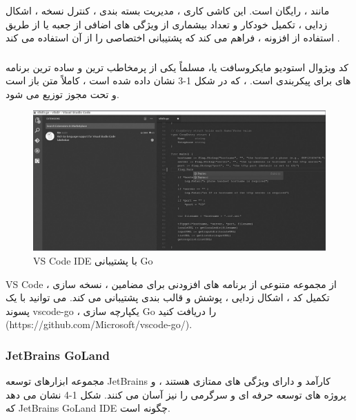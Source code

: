 \documentclass[12pt]{book}
\begin{document}
مانند  ،  رایگان است.
این کاشی کاری ، مدیریت بسته بندی ، کنترل نسخه ، اشکال زدایی ، تکمیل خودکار و تعداد بیشماری از ویژگی های اضافی از جعبه یا از طریق استفاده از افزونه  ، فراهم می کند که پشتیبانی اختصاصی را از آن استفاده می کند .
\subsubsection{}
کد ویژوال استودیو مایکروسافت یا، مسلماً یکی از پرمخاطب ترین و ساده ترین برنامه های  برای پیکربندی است.
 ، که در شکل 1-3 نشان داده شده است ، کاملاً متن باز است و تحت مجوز  توزیع می شود.
\begin{figure}
	\caption{VS Code IDE با پشتیبانی Go}
	\centering
	\includegraphics[width=1\textwidth]{images/vscode.png}
\end{figure}

VS Code از مجموعه متنوعی از برنامه های افزودنی برای مضامین ، نسخه سازی ، تکمیل کد ، اشکال زدایی ، پوشش و قالب بندی پشتیبانی می کند.
می توانید با یک پسوند vscode-go ، یکپارچه سازی Go را دریافت کنید (https://github.com/Microsoft/vscode-go/).
\subsubsection{JetBrains GoLand}
مجموعه ابزارهای توسعه JetBrains کارآمد و دارای ویژگی های ممتازی هستند ، و پروژه های توسعه حرفه ای و سرگرمی را نیز آسان می کنند.
شکل 1-4 نشان می دهد که JetBrains GoLand IDE چگونه است.
\end{document}

